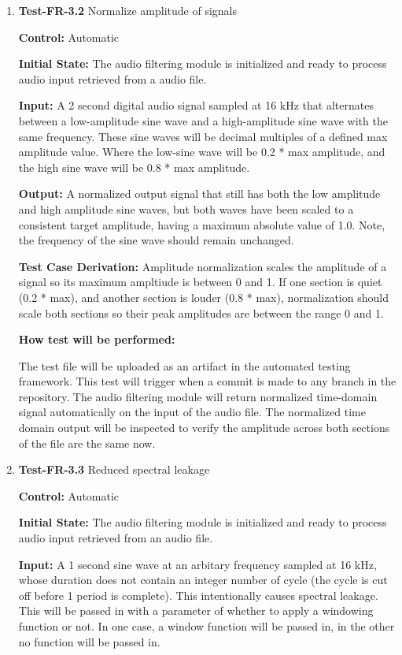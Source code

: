 \documentclass[12pt, titlepage]{article}
\begin{document}
\begin{enumerate}
\item{\textbf{Test-FR-3.2} Normalize amplitude of signals\\}

\textbf{Control:} Automatic
					
\textbf{Initial State:} 
The audio filtering module is initialized and ready to process audio input 
retrieved from a audio file. 
					
\textbf{Input:}
A 2 second digital audio signal sampled at 16 kHz that alternates between a 
low-amplitude sine wave and a high-amplitude sine wave with the same frequency. 
These sine waves will be decimal multiples of a defined max amplitude value. 
Where the low-sine wave will be 0.2 * max amplitude, and the high sine wave will
 be 0.8 * max amplitude. 
					
\textbf{Output:}
A normalized output signal that still has both the low amplitude and high 
amplitude sine waves, but both waves have been scaled to a consistent target 
amplitude, having a maximum absolute value of 1.0. Note, the frequency of the 
sine wave should remain unchanged. 

\textbf{Test Case Derivation:} 
Amplitude normalization scales the amplitude of a signal so its maximum 
ampltiude is between 0 and 1. If one section is quiet (0.2 * max), and 
another section is louder (0.8 * max), normalization should scale both sections 
so their peak amplitudes are between the range 0 and 1. 
					
\textbf{How test will be performed:}

The test file will be uploaded as an artifact in the automated testing 
framework. This test will trigger when a commit is made to any branch in the 
repository. The audio filtering module will return normalized time-domain 
signal automatically on the input of the audio file. The normalized time 
domain output will be inspected to verify the amplitude across both sections of 
the file are the same now.

\item{\textbf{Test-FR-3.3} Reduced spectral leakage\\}

\textbf{Control:} Automatic
					
\textbf{Initial State:} 
The audio filtering module is initialized and ready to process audio input 
retrieved from an audio file. 
					
\textbf{Input:}
A 1 second sine wave at an arbitary frequency sampled at 16 kHz, whose duration 
does not contain an integer number of cycle (the cycle is cut off before 1 
period is complete). This intentionally causes spectral leakage. This will be 
passed in with a parameter of whether to apply a windowing function or not. 
In one case, a window function will be passed in, in the other no function
will be passed in.
					

\end{enumerate}
\end{document}
